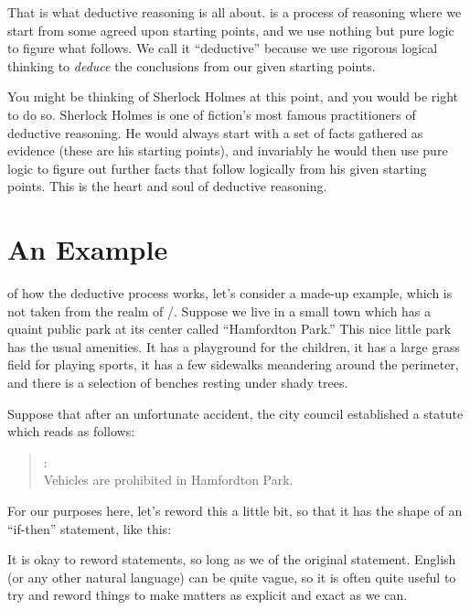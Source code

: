 \documentclass[../../../main.tex]{subfiles}
\begin{document}
That is what deductive reasoning is all about.  is a process of reasoning where we start from some agreed upon starting points, and we use nothing but pure logic to figure what follows. We call it ``deductive'' because we use rigorous logical thinking to \emph{deduce} the conclusions from our given starting points. 

You might be thinking of Sherlock Holmes at this point, and you would be right to do so. Sherlock Holmes is one of fiction's most famous practitioners of deductive reasoning. He would always start with a set of facts gathered as evidence (these are his starting points), and invariably he would then use pure logic to figure out further facts that follow logically from his given starting points. This is the heart and soul of deductive reasoning.


\section{An Example}

 of how the deductive process works, let's consider a made-up example, which is not taken from the realm of \math/. Suppose we live in a small town which has a quaint public park at its center called ``Hamfordton Park.'' This nice little park has the usual amenities. It has a playground for the children, it has a large grass field for playing sports, it has a few sidewalks meandering around the perimeter, and there is a selection of benches resting under shady trees.

Suppose that after an unfortunate accident, the city council established a statute which reads as follows:

\begin{quote}
  : \\
  Vehicles are prohibited in Hamfordton Park.
\end{quote} 

\noindent
For our purposes here, let's reword this a little bit, so that it has the shape of an ``if-then'' statement, like this:

\begin{aside}
  \begin{remark}
    It is okay to reword statements, so long as we  of the original statement. English (or any other natural language) can be quite vague, so it is often quite useful to try and reword things to make matters as explicit and exact as we can.
  \end{remark}
\end{aside}
\end{document}
